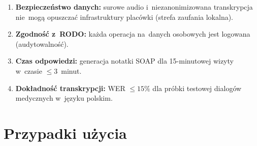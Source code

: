 \begin{enumerate}[label=\textbf{N\arabic*}]
  \item \textbf{Bezpieczeństwo danych:} surowe audio i~niezanonimizowana
        transkrypcja nie~mogą opuszczać infrastruktury placówki (strefa
        zaufania lokalna).
  \item \textbf{Zgodność z~RODO:} każda operacja na~danych
        osobowych jest logowana (audytowalność).
  \item \textbf{Czas odpowiedzi:} generacja notatki SOAP dla
        15-minutowej wizyty w~czasie $\leq 3$~minut.
  \item \textbf{Dokładność transkrypcji:} WER $\leq 15\%$ dla
        próbki testowej dialogów medycznych w~języku polskim.
\end{enumerate}


\section{Przypadki użycia}\label{sec:use-cases}

%
%
%
%
